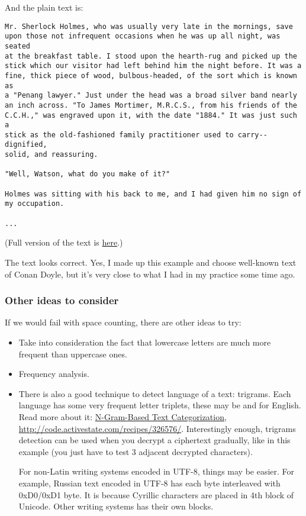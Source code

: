 And the plain text is:

\begin{lstlisting}
Mr. Sherlock Holmes, who was usually very late in the mornings, save
upon those not infrequent occasions when he was up all night, was seated
at the breakfast table. I stood upon the hearth-rug and picked up the
stick which our visitor had left behind him the night before. It was a
fine, thick piece of wood, bulbous-headed, of the sort which is known as
a "Penang lawyer." Just under the head was a broad silver band nearly
an inch across. "To James Mortimer, M.R.C.S., from his friends of the
C.C.H.," was engraved upon it, with the date "1884." It was just such a
stick as the old-fashioned family practitioner used to carry--dignified,
solid, and reassuring.

"Well, Watson, what do you make of it?"

Holmes was sitting with his back to me, and I had given him no sign of
my occupation.

...
\end{lstlisting}

(Full version of the text is \href{https://github.com/dennis714/RE-for-beginners/blob/master/ff/XOR/mask_2/files/plain.txt}{here}.)

The text looks correct.
Yes, I made up this example and choose well-known text of Conan Doyle, but it's very close to what I had in my practice some time ago.

\subsubsection{Other ideas to consider}

If we would fail with space counting, there are other ideas to try:

\begin{itemize}

\item Take into consideration the fact that lowercase letters are much more frequent than uppercase ones.

\item Frequency analysis.

\item There is also a good technique to detect language of a text: trigrams.
Each language has some very frequent letter triplets, these may be  and  for English.
Read more about it:
\href{http://odur.let.rug.nl/~vannoord/TextCat/textcat.pdf}{N-Gram-Based Text Categorization},
\url{http://code.activestate.com/recipes/326576/}.
Interestingly enough, trigrams detection can be used when you decrypt a ciphertext gradually, like in this example (you just have to test 3 adjacent decrypted characters).

For non-Latin writing systems encoded in UTF-8, things may be easier. For example, Russian text encoded in UTF-8 has each byte interleaved with 0xD0/0xD1 byte.
It is because Cyrillic characters are placed in 4th block of Unicode.
Other writing systems has their own blocks.

\end{itemize}
